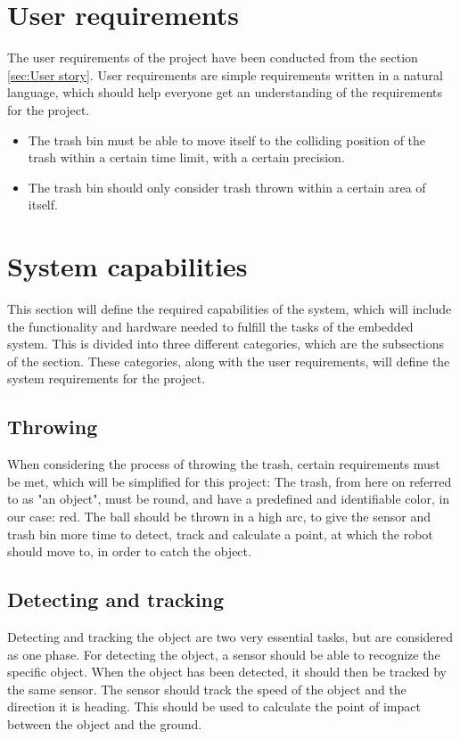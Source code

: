 \section{User requirements}
\label{sec:User requirements}
The user requirements of the project have been conducted from the section \ref{sec:User story}. User requirements are simple requirements written in a natural language, which should help everyone get an understanding of the requirements for the project.

\begin{itemize}
\item The trash bin must be able to move itself to the colliding position of the trash within a certain time limit, with a certain precision.
\item The trash bin should only consider trash thrown within a certain area of itself.
\end{itemize}

\section{System capabilities}
\label{sec:System capabilities}
This section will define the required capabilities of the system, which will include the functionality and hardware needed to fulfill the tasks of the embedded system. This is divided into three different categories, which are the subsections of the section. These categories, along with the user requirements, will define the system requirements for the project.

\subsection{Throwing}
\label{sec:ThrowingAnalysis}
When considering the process of throwing the trash, certain requirements must be met, which will be simplified for this project:
The trash, from here on referred to as "an object", must be round, and have a predefined and identifiable color, in our case: red.  \newline
The ball should be thrown in a high arc, to give the sensor and trash bin more time to detect, track and calculate a point, at which the robot should move to, in order to catch the object.

\subsection{Detecting and tracking}
\label{sec:Detecting and trackingAnalysis}
Detecting and tracking the object are two very essential tasks, but are considered as one phase. For detecting the object, a sensor should be able to recognize the specific object. \newline When the object has been detected, it should then be tracked by the same sensor. The sensor should track the speed of the object and the direction it is heading. This should be used to calculate the point of impact between the object and the ground.

